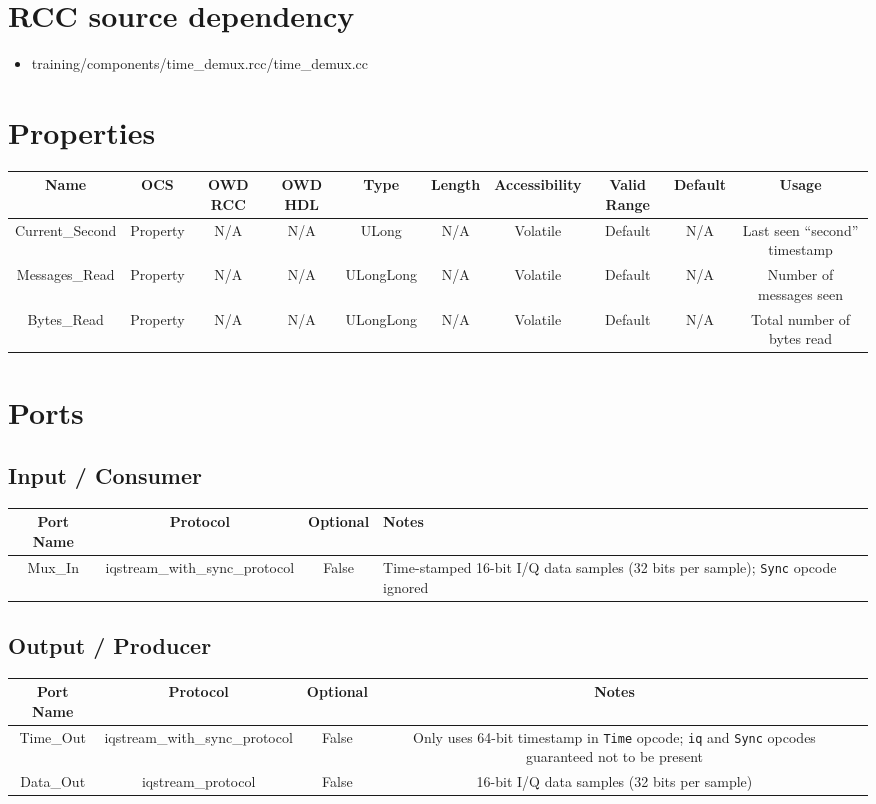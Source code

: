 \documentclass{article}
\begin{document}
\section*{RCC source dependency}
	\begin{itemize}
		\item training/components/time\_demux.rcc/time\_demux.cc
	\end{itemize}

\begin{landscape}
\section*{Properties}
	\scriptsize
	\begin{tabular}{|c|c|c|c|c|c|c|c|c|c|}
		\hline
		\rowcolor{blue}
		Name & OCS & OWD RCC & OWD HDL & Type & Length & Accessibility & Valid Range & Default & Usage \\
		\hline
		Current\_Second & Property & N/A & N/A & ULong & N/A & Volatile & Default & N/A & Last seen ``second'' timestamp \\
		\hline
		Messages\_Read & Property & N/A & N/A & ULongLong & N/A & Volatile & Default & N/A & Number of messages seen \\
		\hline
		Bytes\_Read & Property & N/A & N/A & ULongLong & N/A & Volatile & Default & N/A & Total number of bytes read \\
		\hline
	\end{tabular}
\section*{Ports}
	\subsection*{Input / Consumer}
		\scriptsize
		\begin{tabular}{|c|c|c|M{10.2cm}|}
			\hline
			Port Name & Protocol & Optional & Notes \\
			\hline
			Mux\_In
			& iqstream\_with\_sync\_protocol
			& False
			& Time-stamped 16-bit I/Q data samples (32 bits per sample); \verb+Sync+ opcode ignored\\
			\hline
		\end{tabular}
	\subsection*{Output / Producer}
		\scriptsize
		\begin{tabular}{|c|c|c|c|M{10.2cm}|}
			\hline
			Port Name & Protocol & Optional & Notes \\
			\hline
			Time\_Out
			& iqstream\_with\_sync\_protocol
			& False
			& Only uses 64-bit timestamp in \verb+Time+ opcode; \verb+iq+ and \verb+Sync+ opcodes guaranteed not to be present\\
			\hline
			Data\_Out
			& iqstream\_protocol
			& False
			& 16-bit I/Q data samples (32 bits per sample) \\
			\hline
		\end{tabular}
\end{landscape}
\end{document}
